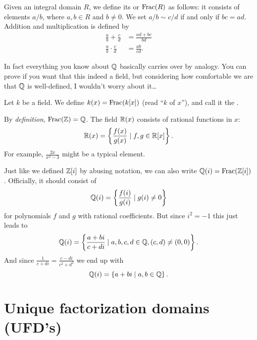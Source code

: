 \begin{definition}
	Given an integral domain $R$,
	we define its  or 
	$\operatorname{Frac}(R)$ as follows:
	it consists of elements $a / b$, where $a,b \in R$ and $b \neq 0$.
	We set $a / b \sim c / d$ if and only if $bc = ad$.
	Addition and multiplication is defined by
	\begin{align*}
		\frac ab + \frac cd &= \frac{ad+bc}{bd} \\
		\frac ab \cdot \frac cd &= \frac{ab}{cd}.
	\end{align*}
\end{definition}
In fact everything you know about $\mathbb Q$ basically carries over by analogy.
You can prove if you want that this indeed a field, but 
considering how comfortable we are that $\mathbb Q$ is well-defined,
I wouldn't worry about it\dots

\begin{definition}
	Let $k$ be a field.
	We define $k(x) = \operatorname{Frac}(k[x])$
	(read ``$k$ of $x$''),
	and call it the .
\end{definition}

\begin{example}
	\listhack
	\begin{enumerate}[(a)]
		\ii By \emph{definition}, $\operatorname{Frac}(\mathbb Z) = \mathbb Q$.
		\ii The field $\mathbb R(x)$ consists of rational functions in $x$:
		\[ \mathbb R(x) = \left\{ \frac{f(x)}{g(x)} \mid f,g \in \mathbb R[x] \right\}. \]
		For example, $\frac{2x}{x^2-3}$ might be a typical element.
	\end{enumerate}
\end{example}

\begin{example}
	\label{ex:gaussian_rationals}
	Just like we defined $\mathbb Z[i]$ by abusing notation,
	we can also write $\mathbb Q(i) = \operatorname{Frac}(\mathbb Z[i])$.
	Officially, it should consist of
	\[ \mathbb Q(i) = \left\{ \frac{f(i)}{g(i)} \mid g(i) \ne 0 \right\} \]
	for polynomials $f$ and $g$ with rational coefficients.
	But since $i^2=-1$ this just leads to
	\[ \mathbb Q(i) = \left\{ \frac{a+bi}{c+di} \mid a,b,c,d \in \mathbb Q,
		(c,d) \ne (0,0) \right\}. \]
	And since $\frac{1}{c+di} = \frac{c-di}{c^2+d^2}$ we end up with
	\[ \mathbb Q(i) = \left\{ a+bi \mid a,b \in \mathbb Q \right\}. \]
\end{example}


\section{Unique factorization domains (UFD's)}

